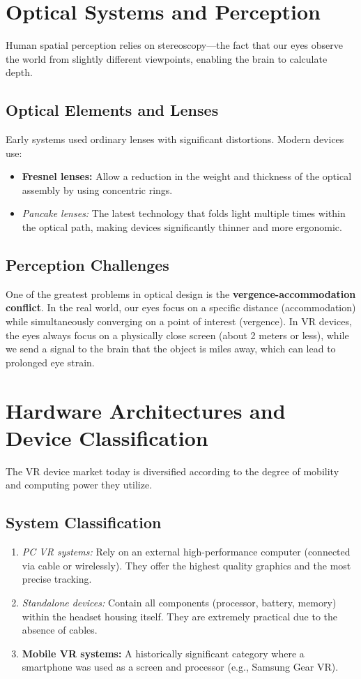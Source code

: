 \documentclass[12pt,a4paper]{article}
\begin{document}
\section{Optical Systems and Perception}

Human spatial perception relies on stereoscopy—the fact that our eyes observe the world from slightly different viewpoints, enabling the brain to calculate depth.

\subsection{Optical Elements and Lenses}
Early systems used ordinary lenses with significant distortions. Modern devices use:
\begin{itemize}
    \item \textbf{Fresnel lenses:} Allow a reduction in the weight and thickness of the optical assembly by using concentric rings.
    \item \textit{Pancake lenses:} The latest technology that folds light multiple times within the optical path, making devices significantly thinner and more ergonomic.
\end{itemize}

\subsection{Perception Challenges}
One of the greatest problems in optical design is the \textbf{vergence-accommodation conflict}. In the real world, our eyes focus on a specific distance (accommodation) while simultaneously converging on a point of interest (vergence). In VR devices, the eyes always focus on a physically close screen (about 2 meters or less), while we send a signal to the brain that the object is miles away, which can lead to prolonged eye strain.

\section{Hardware Architectures and Device Classification}

The VR device market today is diversified according to the degree of mobility and computing power they utilize.

\subsection{System Classification}
\begin{enumerate}
    \item \textit{PC VR systems:} Rely on an external high-performance computer (connected via cable or wirelessly). They offer the highest quality graphics and the most precise tracking.
    \item \textit{Standalone devices:} Contain all components (processor, battery, memory) within the headset housing itself. They are extremely practical due to the absence of cables.
    \item \textbf{Mobile VR systems:} A historically significant category where a smartphone was used as a screen and processor (e.g., Samsung Gear VR).
\end{enumerate}
\end{document}
